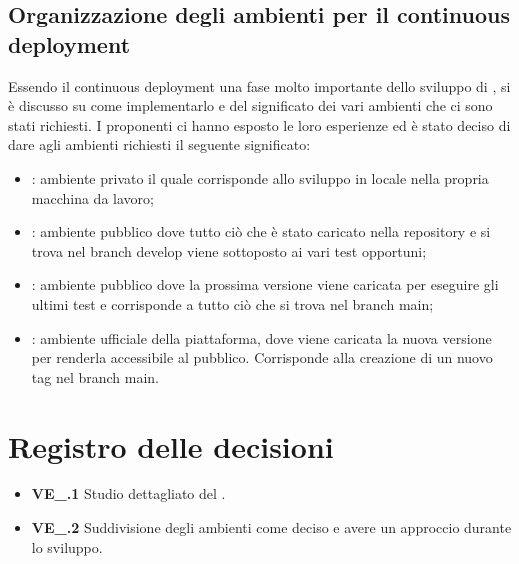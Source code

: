 \subsection{Organizzazione degli ambienti per il continuous deployment}
Essendo il continuous deployment una fase molto importante dello sviluppo di \NomeProgetto, si è discusso su come implementarlo e del significato dei vari ambienti che ci sono stati richiesti. I proponenti ci hanno esposto le loro esperienze ed è stato deciso di dare agli ambienti richiesti il seguente significato:
\begin{itemize}
	\item {}: ambiente privato il quale corrisponde allo sviluppo in locale nella propria macchina da lavoro;
	\item {}: ambiente pubblico dove tutto ciò che è stato caricato nella repository e si trova nel branch develop viene sottoposto ai vari test opportuni;
	\item {}: ambiente pubblico dove la prossima versione viene caricata per eseguire gli ultimi test e corrisponde a tutto ciò che si trova nel branch main;
	\item {}: ambiente ufficiale della piattaforma, dove viene caricata la nuova versione per renderla accessibile al pubblico. Corrisponde alla creazione di un nuovo tag nel branch main.
\end{itemize}

\section{Registro delle decisioni}
\begin{itemize}
	\item \textbf{VE\_\Data.1} Studio dettagliato del .
	\item \textbf{VE\_\Data.2} Suddivisione degli ambienti come deciso e avere un approccio  durante lo sviluppo.
\end{itemize}
